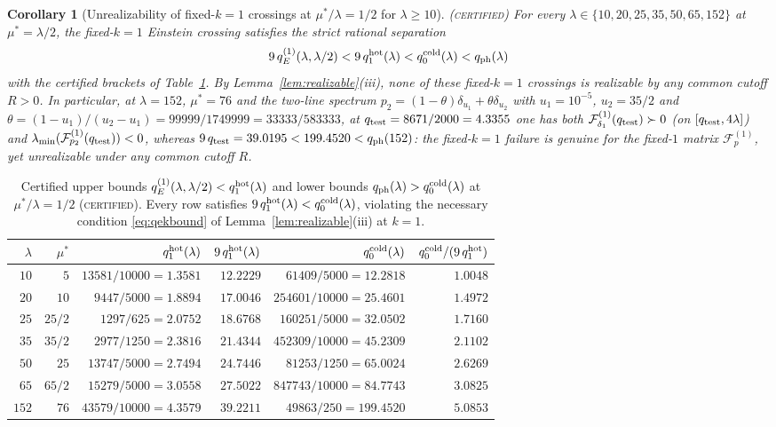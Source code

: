 \documentclass[11pt]{article}
\newcommand{\Fcal}{\mathcal F}
\newcommand{\muS}{\mu^{*}}
\newtheorem{corollary}[theorem]{Corollary}
\theoremstyle{definition}
\theoremstyle{remark}
\newcommand{\certified}{\textnormal{\textsc{(certified)}}}
\begin{document}
\begin{corollary}[Unrealizability of fixed-$k=1$ crossings at $\muS/\lambda=1/2$ for $\lambda\ge10$]
\label{cor:unrealizable}\certified
For every $\lambda\in\{10,20,25,35,50,65,152\}$ at $\muS=\lambda/2$, the fixed-$k=1$
Einstein crossing satisfies the strict rational separation
\begin{equation}\label{eq:9q1}
9\,q_E^{(1)}(\lambda,\lambda/2)<9\,q_1^{\rm hot}(\lambda)<q_0^{\rm cold}(\lambda)
<q_{\rm ph}(\lambda)
\end{equation}
with the certified brackets of Table~\ref{tab:realizable}. By Lemma~\ref{lem:realizable}(iii),
none of these fixed-$k=1$ crossings is realizable by any common cutoff $R>0$. In
particular, at $\lambda=152$, $\muS=76$ and the two-line spectrum
$p_2=(1-\theta)\delta_{u_1}+\theta\delta_{u_2}$ with $u_1=10^{-5}$, $u_2=35/2$ and
$\theta=(1-u_1)/(u_2-u_1)=99999/1749999=33333/583333$, at $q_{\rm test}=8671/2000=4.3355$
one has both $\Fcal_{\delta_1}^{(1)}(q_{\rm test})\succ0$ (on $[q_{\rm test},4\lambda]$) and
$\lambda_{\min}(\Fcal_{p_2}^{(1)}(q_{\rm test}))<0$, whereas
$9\,q_{\rm test}=39.0195<199.4520<q_{\rm ph}(152)$: the fixed-$k=1$ failure is genuine for
the fixed-$1$ matrix $\Fcal_p^{(1)}$, yet unrealizable under any common cutoff $R$.
\end{corollary}

\begin{table}[t]
\centering
\small
\setlength{\tabcolsep}{5pt}
\begin{tabular}{@{}rrrrrr@{}}
\toprule
$\lambda$ & $\muS$ & $q_1^{\rm hot}(\lambda)$ & $9\,q_1^{\rm hot}(\lambda)$ &
$q_0^{\rm cold}(\lambda)$ & $q_0^{\rm cold}/(9\,q_1^{\rm hot})$\\
\midrule
$10$ & $5$ & $13581/10000=1.3581$ & $12.2229$ & $61409/5000=12.2818$ & $1.0048$\\
$20$ & $10$ & $9447/5000=1.8894$ & $17.0046$ & $254601/10000=25.4601$ & $1.4972$\\
$25$ & $25/2$ & $1297/625=2.0752$ & $18.6768$ & $160251/5000=32.0502$ & $1.7160$\\
$35$ & $35/2$ & $2977/1250=2.3816$ & $21.4344$ & $452309/10000=45.2309$ & $2.1102$\\
$50$ & $25$ & $13747/5000=2.7494$ & $24.7446$ & $81253/1250=65.0024$ & $2.6269$\\
$65$ & $65/2$ & $15279/5000=3.0558$ & $27.5022$ & $847743/10000=84.7743$ & $3.0825$\\
$152$ & $76$ & $43579/10000=4.3579$ & $39.2211$ & $49863/250=199.4520$ & $5.0853$\\
\bottomrule
\end{tabular}
\caption{Certified upper bounds $q_E^{(1)}(\lambda,\lambda/2)<q_1^{\rm hot}(\lambda)$ and
lower bounds $q_{\rm ph}(\lambda)>q_0^{\rm cold}(\lambda)$ at $\muS/\lambda=1/2$
(\textsc{certified}). Every row satisfies $9\,q_1^{\rm hot}(\lambda)<q_0^{\rm cold}(\lambda)$,
violating the necessary condition \eqref{eq:qekbound} of Lemma~\ref{lem:realizable}(iii) at
$k=1$.}
\label{tab:realizable}
\end{table}
\end{document}
